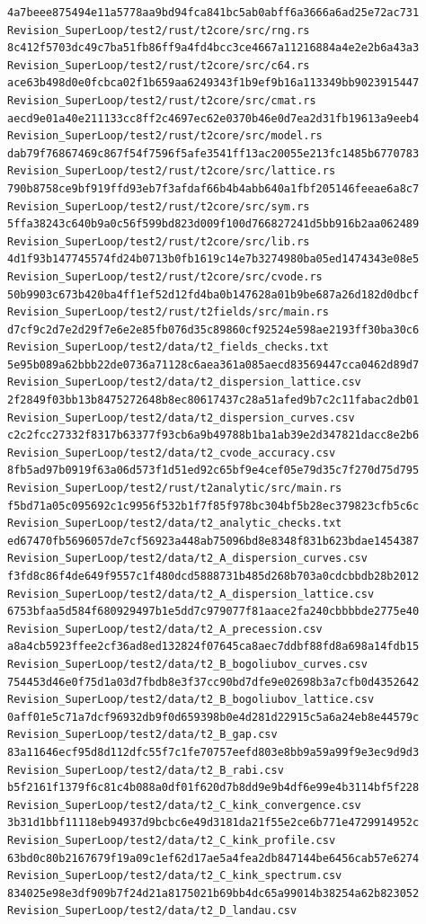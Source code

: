\documentclass[
  10pt,
]{article}
\begin{document}
\begin{verbatim}
4a7beee875494e11a5778aa9bd94fca841bc5ab0abff6a3666a6ad25e72ac731  Revision_SuperLoop/test2/rust/t2core/src/rng.rs
8c412f5703dc49c7ba51fb86ff9a4fd4bcc3ce4667a11216884a4e2e2b6a43a3  Revision_SuperLoop/test2/rust/t2core/src/c64.rs
ace63b498d0e0fcbca02f1b659aa6249343f1b9ef9b16a113349bb9023915447  Revision_SuperLoop/test2/rust/t2core/src/cmat.rs
aecd9e01a40e211133cc8ff2c4697ec62e0370b46e0d7ea2d31fb19613a9eeb4  Revision_SuperLoop/test2/rust/t2core/src/model.rs
dab79f76867469c867f54f7596f5afe3541ff13ac20055e213fc1485b6770783  Revision_SuperLoop/test2/rust/t2core/src/lattice.rs
790b8758ce9bf919ffd93eb7f3afdaf66b4b4abb640a1fbf205146feeae6a8c7  Revision_SuperLoop/test2/rust/t2core/src/sym.rs
5ffa38243c640b9a0c56f599bd823d009f100d766827241d5bb916b2aa062489  Revision_SuperLoop/test2/rust/t2core/src/lib.rs
4d1f93b147745574fd24b0713b0fb1619c14e7b3274980ba05ed1474343e08e5  Revision_SuperLoop/test2/rust/t2core/src/cvode.rs
50b9903c673b420ba4ff1ef52d12fd4ba0b147628a01b9be687a26d182d0dbcf  Revision_SuperLoop/test2/rust/t2fields/src/main.rs
d7cf9c2d7e2d29f7e6e2e85fb076d35c89860cf92524e598ae2193ff30ba30c6  Revision_SuperLoop/test2/data/t2_fields_checks.txt
5e95b089a62bbb22de0736a71128c6aea361a085aecd83569447cca0462d89d7  Revision_SuperLoop/test2/data/t2_dispersion_lattice.csv
2f2849f03bb13b8475272648b8ec80617437c28a51afed9b7c2c11fabac2db01  Revision_SuperLoop/test2/data/t2_dispersion_curves.csv
c2c2fcc27332f8317b63377f93cb6a9b49788b1ba1ab39e2d347821dacc8e2b6  Revision_SuperLoop/test2/data/t2_cvode_accuracy.csv
8fb5ad97b0919f63a06d573f1d51ed92c65bf9e4cef05e79d35c7f270d75d795  Revision_SuperLoop/test2/rust/t2analytic/src/main.rs
f5bd71a05c095692c1c9956f532b1f7f85f978bc304bf5b28ec379823cfb5c6c  Revision_SuperLoop/test2/data/t2_analytic_checks.txt
ed67470fb5696057de7cf56923a448ab75096bd8e8348f831b623bdae1454387  Revision_SuperLoop/test2/data/t2_A_dispersion_curves.csv
f3fd8c86f4de649f9557c1f480dcd5888731b485d268b703a0cdcbbdb28b2012  Revision_SuperLoop/test2/data/t2_A_dispersion_lattice.csv
6753bfaa5d584f680929497b1e5dd7c979077f81aace2fa240cbbbbde2775e40  Revision_SuperLoop/test2/data/t2_A_precession.csv
a8a4cb5923ffee2cf36ad8ed132824f07645ca8aec7ddbf88fd8a698a14fdb15  Revision_SuperLoop/test2/data/t2_B_bogoliubov_curves.csv
754453d46e0f75d1a03d7fbdb8e3f37cc90bd7dfe9e02698b3a7cfb0d4352642  Revision_SuperLoop/test2/data/t2_B_bogoliubov_lattice.csv
0aff01e5c71a7dcf96932db9f0d659398b0e4d281d22915c5a6a24eb8e44579c  Revision_SuperLoop/test2/data/t2_B_gap.csv
83a11646ecf95d8d112dfc55f7c1fe70757eefd803e8bb9a59a99f9e3ec9d9d3  Revision_SuperLoop/test2/data/t2_B_rabi.csv
b5f2161f1379f6c81c4b088a0df01f620d7b8dd9e9b4df6e99e4b3114bf5f228  Revision_SuperLoop/test2/data/t2_C_kink_convergence.csv
3b31d1bbf11118eb94937d9bcbc6e49d3181da21f55e2ce6b771e4729914952c  Revision_SuperLoop/test2/data/t2_C_kink_profile.csv
63bd0c80b2167679f19a09c1ef62d17ae5a4fea2db847144be6456cab57e6274  Revision_SuperLoop/test2/data/t2_C_kink_spectrum.csv
834025e98e3df909b7f24d21a8175021b69bb4dc65a99014b38254a62b823052  Revision_SuperLoop/test2/data/t2_D_landau.csv
\end{verbatim}
\end{document}
